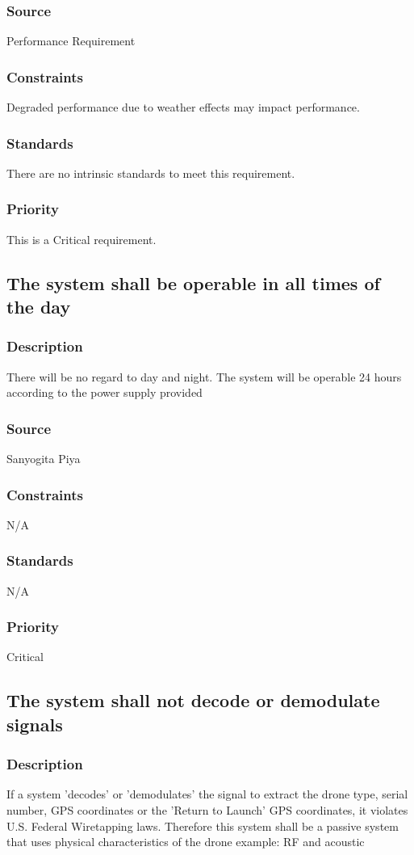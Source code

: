 \subsubsection{Source}
Performance Requirement
\subsubsection{Constraints}
Degraded performance due to weather effects may impact performance.
\subsubsection{Standards}
There are no intrinsic standards to meet this requirement.
\subsubsection{Priority}
This is a Critical requirement.

\subsection{The system shall be operable in all times of the day}
\subsubsection{Description}
There will be no regard to day and night. The system will be operable 24 hours according to the power supply provided
\subsubsection{Source}
Sanyogita Piya
\subsubsection{Constraints}
N/A
\subsubsection{Standards}
N/A
\subsubsection{Priority}
Critical

\subsection{The system shall not decode or demodulate signals}
\subsubsection{Description}
If a system 'decodes' or 'demodulates' the signal to extract the drone type, serial number, GPS coordinates or the 'Return to Launch' GPS coordinates, it violates U.S. Federal Wiretapping laws. Therefore this system shall be a passive system that uses physical characteristics of the drone example: RF and acoustic
